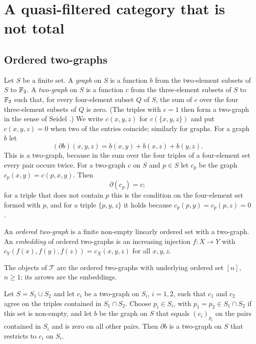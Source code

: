 \section{A quasi-filtered category that is not total}\label{sec:twographs}

\subsection{Ordered two-graphs}

Let $S$ be a finite set. A \emph{graph} on $S$ is a function $b$ from the
two-element subsets of $S$ to $\mathbb{F}_2$. A \emph{two-graph} on $S$ is a function
$c$ from the three-element subsets of $S$ to $\mathbb{F}_2$ such that, for every
four-element subset $Q$ of $S$, the sum of $c$ over the four three-element
subsets of $Q$ is zero. (The triples with $c=1$ then form a two-graph in the
sense of Seidel \cite{Seidel}.) We write $c(x,y,z)$ for $c(\{x,y,z\})$ and
put $c(x,y,z)=0$ when two of the entries coincide; similarly for graphs. For
a graph $b$ let
\[
 (\partial b)(x,y,z)=b(x,y)+b(x,z)+b(y,z).
\]
This is a two-graph, because in the sum over the four triples of a
four-element set every pair occurs twice. For a two-graph $c$ on $S$ and
$p\in S$ let $c_p$ be the graph $c_p(x,y)=c(p,x,y)$. Then
\begin{equation}\label{eq:anchor}
 \partial(c_p)=c ;
\end{equation}
for a triple that does not contain $p$ this is the condition on the
four-element set formed with $p$, and for a triple $\{p,y,z\}$ it holds because
$c_p(p,y)=c_p(p,z)=0$.

An \emph{ordered two-graph} is a finite non-empty linearly ordered set with a
two-graph. An \emph{embedding} of ordered two-graphs is an increasing
injection $f\colon X\to Y$ with $c_Y(f(x),f(y),f(z))=c_X(x,y,z)$ for all
$x,y,z$.

\begin{definition}
The objects of $\mathcal T$ are the ordered two-graphs with underlying ordered
set $[n]$, $n\ge1$; its arrows are the embeddings.
\end{definition}

\begin{lemma}\label{lem:anchored}
Let $S=S_1\cup S_2$ and let $c_i$ be a two-graph on $S_i$, $i=1,2$, such that
$c_1$ and $c_2$ agree on the triples contained in $S_1\cap S_2$. Choose
$p_i\in S_i$, with $p_1=p_2\in S_1\cap S_2$ if this set is non-empty, and let
$b$ be the graph on $S$ that equals $(c_i)_{p_i}$ on the pairs contained in
$S_i$ and is zero on all other pairs. Then $\partial b$ is a two-graph on $S$
that restricts to $c_i$ on $S_i$.
\end{lemma}

